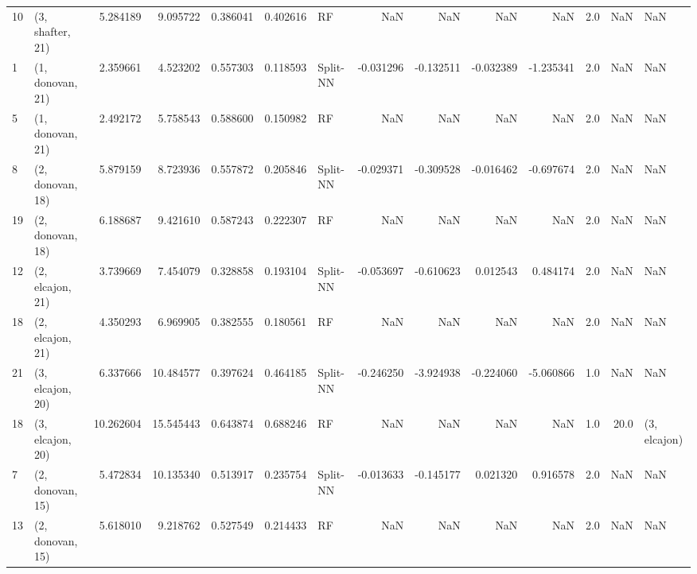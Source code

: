 \begin{tabular}{llrrrrlrrrrrrl}
10 &  (3, shafter, 21) &   5.284189 &   9.095722 &   0.386041 &  0.402616 &          RF &             NaN &           NaN &            NaN &          NaN &            2.0 &    NaN &              NaN \\
1  &  (1, donovan, 21) &   2.359661 &   4.523202 &   0.557303 &  0.118593 &    Split-NN &       -0.031296 &     -0.132511 &      -0.032389 &    -1.235341 &            2.0 &    NaN &              NaN \\
5  &  (1, donovan, 21) &   2.492172 &   5.758543 &   0.588600 &  0.150982 &          RF &             NaN &           NaN &            NaN &          NaN &            2.0 &    NaN &              NaN \\
8  &  (2, donovan, 18) &   5.879159 &   8.723936 &   0.557872 &  0.205846 &    Split-NN &       -0.029371 &     -0.309528 &      -0.016462 &    -0.697674 &            2.0 &    NaN &              NaN \\
19 &  (2, donovan, 18) &   6.188687 &   9.421610 &   0.587243 &  0.222307 &          RF &             NaN &           NaN &            NaN &          NaN &            2.0 &    NaN &              NaN \\
12 &  (2, elcajon, 21) &   3.739669 &   7.454079 &   0.328858 &  0.193104 &    Split-NN &       -0.053697 &     -0.610623 &       0.012543 &     0.484174 &            2.0 &    NaN &              NaN \\
18 &  (2, elcajon, 21) &   4.350293 &   6.969905 &   0.382555 &  0.180561 &          RF &             NaN &           NaN &            NaN &          NaN &            2.0 &    NaN &              NaN \\
21 &  (3, elcajon, 20) &   6.337666 &  10.484577 &   0.397624 &  0.464185 &    Split-NN &       -0.246250 &     -3.924938 &      -0.224060 &    -5.060866 &            1.0 &    NaN &              NaN \\
18 &  (3, elcajon, 20) &  10.262604 &  15.545443 &   0.643874 &  0.688246 &          RF &             NaN &           NaN &            NaN &          NaN &            1.0 &   20.0 &     (3, elcajon) \\
7  &  (2, donovan, 15) &   5.472834 &  10.135340 &   0.513917 &  0.235754 &    Split-NN &       -0.013633 &     -0.145177 &       0.021320 &     0.916578 &            2.0 &    NaN &              NaN \\
13 &  (2, donovan, 15) &   5.618010 &   9.218762 &   0.527549 &  0.214433 &          RF &             NaN &           NaN &            NaN &          NaN &            2.0 &    NaN &              NaN \\

\end{tabular}
